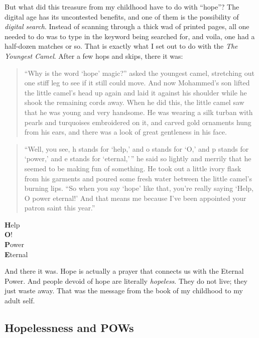 \documentclass[
  a4paper,
]{article}
\begin{document}
But what did this treasure from my childhood have to do with ``hope''?
The digital age has its uncontested benefits, and one of them is the
possibility of \emph{digital search}. Instead of scanning through a
thick wad of printed pages, all one needed to do was to type in the
keyword being searched for, and voila, one had a half-dozen matches or
so. That is exactly what I set out to do with the \emph{The Youngest
Camel}. After a few hops and skips, there it was:

\begin{quote}
``Why is the word `hope' magic?'' asked the youngest camel, stretching
out one stiff leg to see if it still could move. And now Mohammed's son
lifted the little camel's head up again and laid it against his shoulder
while he shook the remaining cords away. When he did this, the little
camel saw that he was young and very handsome. He was wearing a silk
turban with pearls and turquoises embroidered on it, and carved gold
ornaments hung from his ears, and there was a look of great gentleness
in his face.
\end{quote}

\begin{quote}
``Well, you see, h stands for `help,' and o stands for `O,' and p stands
for `power,' and e stands for `eternal,'\,'' he said so lightly and
merrily that he seemed to be making fun of something. He took out a
little ivory flask from his garments and poured some fresh water between
the little camel's burning lips. ``So when you say `hope' like that,
you're really saying `Help, O power eternal!' And that means me because
I've been appointed your patron saint this year.''
\end{quote}

\begin{center}

\textbf{H}elp\\
\textbf{O}!\\
\textbf{P}ower\\
\textbf{E}ternal

\end{center}

And there it was. Hope is actually a prayer that connects us with the
Eternal Power. And people devoid of hope are literally \emph{hopeless}.
They do not live; they just waste away. That was the message from the
book of my childhood to my adult self.

\hypertarget{hopelessness-and-pows}{%
\subsection{Hopelessness and POWs}\label{hopelessness-and-pows}}
\end{document}
